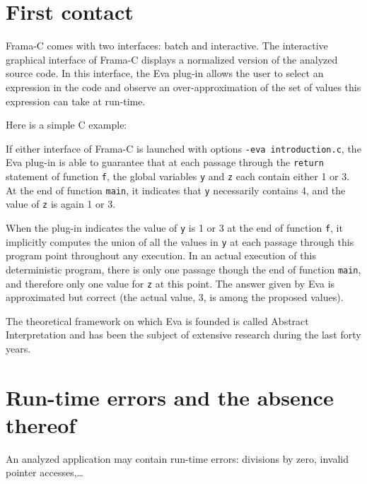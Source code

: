 \documentclass[web]{frama-c-book}
\newcommand{\Eva}{\textsf{Eva}}
\begin{document}
\section{First contact}
Frama-C comes with two interfaces: batch and interactive.
The interactive graphical interface of Frama-C displays
a normalized version of the analyzed source code.
In this interface, the \Eva{} plug-in allows the user
to select an expression in the
code and observe an over-approximation of the set of 
values this expression can take at run-time. 

Here is a simple C example:

If either interface of Frama-C is launched with options
\lstinline|-eva introduction.c|,
the \Eva{} plug-in is able to guarantee that at each passage through 
the \lstinline|return| statement of 
function \lstinline|f|, the global variables \lstinline+y+ and
\lstinline+z+ each contain either 1 or 3. 
At the end of function  \lstinline|main|,
it indicates that  \lstinline|y|
necessarily contains  4, and the value of  \lstinline|z| is again 1 or 3.

When the plug-in indicates the value of \lstinline|y| is 1 or 3
at the end of function \lstinline|f|, it implicitly computes the union
of all the values in \lstinline|y|
at each passage through this program point throughout any execution.
In an actual execution of this deterministic program,
there is only one passage though the end
of function  \lstinline|main|, and therefore only one value for \lstinline|z|
at this point.
The answer given by \Eva{} is approximated but correct (the actual
value, 3, is among the proposed values).

The theoretical framework on which \Eva{} is founded is called
Abstract Interpretation and has been the subject of extensive research
during the last forty years.

\section{Run-time errors and the absence thereof}

An analyzed application may contain run-time errors: divisions by zero,
invalid pointer accesses,\ldots

\end{document}

